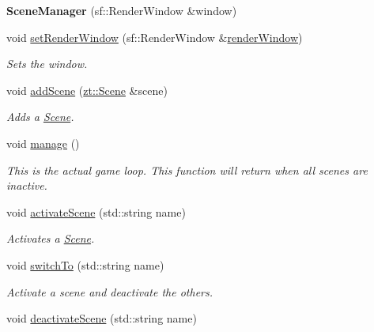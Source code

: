 \begin{DoxyCompactItemize}
\item 
\mbox{\label{classzt_1_1_scene_manager_af087c4fb01189e095d9221efb54619dc}} 
{\bfseries Scene\+Manager} (sf\+::\+Render\+Window \&window)
\item 
void \hyperlink{classzt_1_1_scene_manager_ad6bee2cb8d320e788a2eda8fcdebdbc9}{set\+Render\+Window} (sf\+::\+Render\+Window \&\hyperlink{classzt_1_1_scene_manager_a1a0c6b40321c66709ae36f3ccd9f84f6}{render\+Window})
\begin{DoxyCompactList}\small\item\em Sets the window. \end{DoxyCompactList}\item 
void \hyperlink{classzt_1_1_scene_manager_a063202765a5b757eae0d28bb9badc53b}{add\+Scene} (\hyperlink{classzt_1_1_scene}{zt\+::\+Scene} \&scene)
\begin{DoxyCompactList}\small\item\em Adds a \hyperlink{classzt_1_1_scene}{Scene}. \end{DoxyCompactList}\item 
\mbox{\label{classzt_1_1_scene_manager_a9385d452cd66294db0c03b6366519d4a}} 
void \hyperlink{classzt_1_1_scene_manager_a9385d452cd66294db0c03b6366519d4a}{manage} ()
\begin{DoxyCompactList}\small\item\em This is the actual game loop. This function will return when all scenes are inactive. \end{DoxyCompactList}\item 
void \hyperlink{classzt_1_1_scene_manager_acee2eb38afb510f701dc3dd3c5fe3482}{activate\+Scene} (std\+::string name)
\begin{DoxyCompactList}\small\item\em Activates a \hyperlink{classzt_1_1_scene}{Scene}. \end{DoxyCompactList}\item 
void \hyperlink{classzt_1_1_scene_manager_a90a6e2b62f58123056dd3d475cb64165}{switch\+To} (std\+::string name)
\begin{DoxyCompactList}\small\item\em Activate a scene and deactivate the others. \end{DoxyCompactList}\item 
void \hyperlink{classzt_1_1_scene_manager_a6adb888b88566305c08f1b57b33dbb83}{deactivate\+Scene} (std\+::string name)

\end{DoxyCompactItemize}
